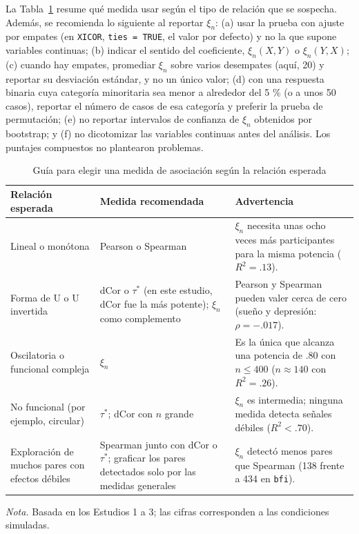\documentclass[man,donotrepeattitle,floatsintext]{apa7}
\begin{document}
La Tabla~\ref{tab:guia} resume qué medida usar según el tipo de relación que se sospecha. Además, se recomienda lo siguiente al reportar $\xi_n$: (a) usar la prueba con ajuste por empates (en \texttt{XICOR}, \texttt{ties = TRUE}, el valor por defecto) y no la que supone variables continuas; (b) indicar el sentido del coeficiente, $\xi_n(X,Y)$ o $\xi_n(Y,X)$; (c) cuando hay empates, promediar $\xi_n$ sobre varios desempates (aquí, 20) y reportar su desviación estándar, y no un único valor; (d) con una respuesta binaria cuya categoría minoritaria sea menor a alrededor del 5 \% (o a unos 50 casos), reportar el número de casos de esa categoría y preferir la prueba de permutación; (e) no reportar intervalos de confianza de $\xi_n$ obtenidos por bootstrap; y (f) no dicotomizar las variables continuas antes del análisis. Los puntajes compuestos no plantearon problemas.

\begin{table}
\caption{Guía para elegir una medida de asociación según la relación esperada}
\label{tab:guia}
\begin{threeparttable}
\small
\begin{tabular}{p{3.6cm}p{4.2cm}p{6.6cm}}
\toprule
Relación esperada & Medida recomendada & Advertencia \\
\midrule
Lineal o monótona & Pearson o Spearman & $\xi_n$ necesita unas ocho veces más participantes para la misma potencia ($R^2=.13$). \\
Forma de U o U invertida & dCor o $\tau^*$ (en este estudio, dCor fue la más potente); $\xi_n$ como complemento & Pearson y Spearman pueden valer cerca de cero (sueño y depresión: $\rho=-.017$). \\
Oscilatoria o funcional compleja & $\xi_n$ & Es la única que alcanza una potencia de .80 con $n\le 400$ ($n\approx 140$ con $R^2=.26$). \\
No funcional (por ejemplo, circular) & $\tau^*$; dCor con $n$ grande & $\xi_n$ es intermedia; ninguna medida detecta señales débiles ($R^2<.70$). \\
Exploración de muchos pares con efectos débiles & Spearman junto con dCor o $\tau^*$; graficar los pares detectados solo por las medidas generales & $\xi_n$ detectó menos pares que Spearman (138 frente a 434 en \texttt{bfi}). \\
\bottomrule
\end{tabular}
\begin{tablenotes}[flushleft]
\small
\item \textit{Nota.} Basada en los Estudios 1 a 3; las cifras corresponden a las condiciones simuladas.
\end{tablenotes}
\end{threeparttable}
\end{table}
\end{document}
